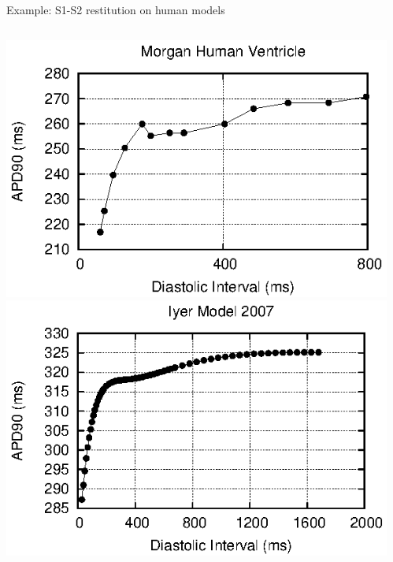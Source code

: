 \documentclass[t,xcolor={usenames,dvipsnames}]{beamer}
\begin{document}
\begin{frame}{Example: S1-S2 restitution on human models}
\begin{columns}[T]
\begin{column}{.33\linewidth}
\begin{center}
\includegraphics[width=\textwidth]{morgan_human_ventricle_s1s2_curve}\\
\vspace{.1cm}
\includegraphics[width=\textwidth]{iyer_model_2007_s1s2_curve}
\end{center}
\end{column}
\begin{column}{.33\linewidth}
\begin{center}

\end{center}
\end{column}
\end{columns}
\end{frame}
\end{document}
